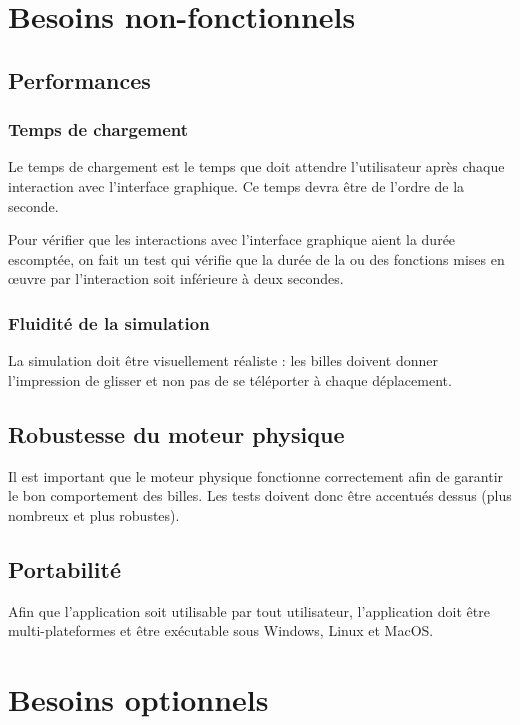 \documentclass{report}
\begin{document}
\section{Besoins non-fonctionnels}

\subsection{Performances}

\subsubsection{Temps de chargement}

Le temps de chargement est le temps que doit attendre l’utilisateur après chaque interaction avec l’interface graphique. Ce temps devra être de l’ordre de la seconde.

Pour vérifier que les interactions avec l’interface graphique aient la durée escomptée, on fait un test qui vérifie que la durée de la ou des fonctions mises en œuvre par l’interaction soit inférieure à deux secondes.


\subsubsection{Fluidité de la simulation}

La simulation doit être visuellement réaliste : les billes doivent donner l’impression de glisser et non pas de se téléporter à chaque déplacement.

\subsection{Robustesse du moteur physique}

Il est important que le moteur physique fonctionne correctement afin de garantir le bon comportement des billes. Les tests doivent donc être accentués dessus (plus nombreux et plus robustes).

\subsection{Portabilité}

Afin que l'application soit utilisable par tout utilisateur, l’application doit être multi-plateformes et être exécutable sous Windows, Linux et MacOS.

\section{Besoins optionnels}
\end{document}
